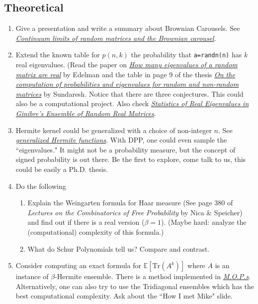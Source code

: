 \documentclass{article}
\begin{document}
\subsection*{Theoretical}
\begin{enumerate}
    \item Give a presentation and write a summary about Brownian Carousels. See \href{https://arxiv.org/pdf/0712.2000.pdf}{\emph{\color{blue}Continuum limits of random matrices and the Brownian carousel}}. 
    \item Extend the known table for $p(n,k)$ the probability that \texttt{a=randn(n)} has $k$ real eigenvalues. (Read the paper on \href{http://www-math.mit.edu/~edelman/homepage/papers/howmany.pdf}{\emph{\color{blue}How many eigenvalues of a random matrix are real}} by Edelman and the table in page 9 of the thesis \href{http://dspace.mit.edu/bitstream/handle/1721.1/54840/587445752.pdf?sequence=1}{\emph{\color{blue}On the computation of probabilities and eigenvalues for random and non-random matrices}} by Sundaresh. Notice that there are three conjectures. This could also be a computational project. Also check \href{http://prl.aps.org/pdf/PRL/v95/i23/e230201}{\emph{\color{blue}Statistics of Real Eigenvalues in Ginibre’s Ensemble of Random Real Matrices}}.
    \item Hermite kernel could be generalized with a choice of non-integer $n$. See \href{https://functions.wolfram.com/HypergeometricFunctions/HermiteHGeneral/02/}{\emph{\color{blue}generalized Hermite functions}}. With DPP, one could even sample the ``eigenvalues." It might not be a probability measure, but the concept of signed probability is out there. Be the first to explore, come talk to us, this could be easily a Ph.D. thesis. 
    \item Do the following
    \begin{enumerate}
        \item Explain the Weingarten formula for Haar measure (See page 380 of \emph{Lectures on the Combinatorics of Free Probability} by  Nica \& Speicher) and  find out if there is a real version ($\beta = 1$). (Maybe hard: analyze the (computational) complexity of this formula.)
        \item What do Schur Polynomials tell us? Compare and contrast.
    \end{enumerate}
    \item Consider computing an exact formula for $\mathbb{E}[\text{Tr}(A^k)]$ where $A$ is an instance of $\beta$-Hermite ensemble. There is a method implemented in \href{https://arxiv.org/pdf/math-ph/0409066.pdf}{\emph{\color{blue}M.O.P.s}}. Alternatively, one can also try to use the Tridiagonal ensembles which has the best computational complexity. Ask about the ``How I met Mike" slide. 

\end{enumerate}
\end{document}
